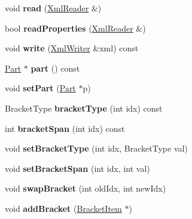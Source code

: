 \begin{DoxyCompactItemize}
void {\bfseries read} (\hyperlink{class_ms_1_1_xml_reader}{Xml\+Reader} \&)
\item 
\mbox{\label{class_ms_1_1_staff_a1a9e8e8d629ab754979942aa95645ea9}} 
bool {\bfseries read\+Properties} (\hyperlink{class_ms_1_1_xml_reader}{Xml\+Reader} \&)
\item 
\mbox{\label{class_ms_1_1_staff_a430b2d551dab1be918fe840ff01e7a61}} 
void {\bfseries write} (\hyperlink{class_ms_1_1_xml_writer}{Xml\+Writer} \&xml) const
\item 
\mbox{\label{class_ms_1_1_staff_ae31dc0de799c1e206af979e65bf837ab}} 
\hyperlink{class_ms_1_1_part}{Part} $\ast$ {\bfseries part} () const
\item 
\mbox{\label{class_ms_1_1_staff_a76a8b771364e62fee751ea01351719c8}} 
void {\bfseries set\+Part} (\hyperlink{class_ms_1_1_part}{Part} $\ast$p)
\item 
\mbox{\label{class_ms_1_1_staff_a53b0a53efec8c1c19a279c1a45714a5e}} 
Bracket\+Type {\bfseries bracket\+Type} (int idx) const
\item 
\mbox{\label{class_ms_1_1_staff_ae98dbc6bdbe12a44d2c943e34d9436e9}} 
int {\bfseries bracket\+Span} (int idx) const
\item 
\mbox{\label{class_ms_1_1_staff_a960c94efe212d0da61b1fd433a2e43e2}} 
void {\bfseries set\+Bracket\+Type} (int idx, Bracket\+Type val)
\item 
\mbox{\label{class_ms_1_1_staff_a221b703b3e4310eba08a273cba4c7c5d}} 
void {\bfseries set\+Bracket\+Span} (int idx, int val)
\item 
\mbox{\label{class_ms_1_1_staff_a0fbd82b996667409f8c14313843b97d4}} 
void {\bfseries swap\+Bracket} (int old\+Idx, int new\+Idx)
\item 
\mbox{\label{class_ms_1_1_staff_a06ee48f3920f2f4bdc66b30ac99efb18}} 
void {\bfseries add\+Bracket} (\hyperlink{class_ms_1_1_bracket_item}{Bracket\+Item} $\ast$)
\item 

\end{DoxyCompactItemize}
